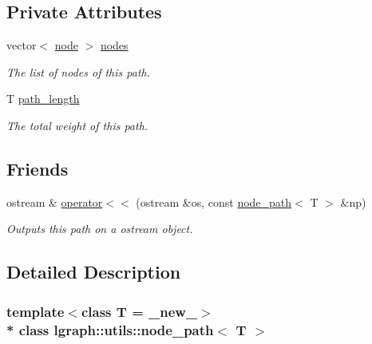 \subsection*{Private Attributes}
\begin{DoxyCompactItemize}
\item 
vector$<$ \hyperlink{namespacelgraph_1_1utils_ab9c6b34241f0b68372c55f34c460e863}{node} $>$ \hyperlink{classlgraph_1_1utils_1_1node__path_af0067294d0390cef2c11ece4b080257c}{nodes}\hypertarget{classlgraph_1_1utils_1_1node__path_af0067294d0390cef2c11ece4b080257c}{}\label{classlgraph_1_1utils_1_1node__path_af0067294d0390cef2c11ece4b080257c}

\begin{DoxyCompactList}\small\item\em The list of nodes of this path. \end{DoxyCompactList}\item 
T \hyperlink{classlgraph_1_1utils_1_1node__path_a43d91c7647402a07b896d74cb4a7a783}{path\+\_\+length}
\begin{DoxyCompactList}\small\item\em The total weight of this path. \end{DoxyCompactList}\end{DoxyCompactItemize}
\subsection*{Friends}
\begin{DoxyCompactItemize}
\item 
ostream \& \hyperlink{classlgraph_1_1utils_1_1node__path_aaa2ab8603e9a2ab44dd473a2a4a722b0}{operator$<$$<$} (ostream \&os, const \hyperlink{classlgraph_1_1utils_1_1node__path}{node\+\_\+path}$<$ T $>$ \&np)
\begin{DoxyCompactList}\small\item\em Outputs this path on a {\itshape ostream} object. \end{DoxyCompactList}\end{DoxyCompactItemize}


\subsection{Detailed Description}
\subsubsection*{template$<$class T = \+\_\+new\+\_\+$>$\\*
class lgraph\+::utils\+::node\+\_\+path$<$ T $>$}

